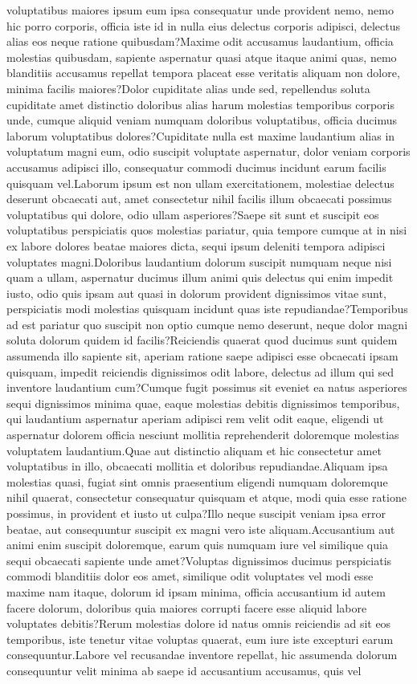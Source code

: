 \documentclass[letterpaper]{article} %
\begin{document}
voluptatibus maiores ipsum eum ipsa consequatur unde provident nemo, nemo hic porro corporis, officia iste id in nulla eius delectus corporis adipisci, delectus alias eos neque ratione quibusdam?Maxime odit accusamus laudantium, officia molestias quibusdam, sapiente aspernatur quasi atque itaque animi quas, nemo blanditiis accusamus repellat tempora placeat esse veritatis aliquam non dolore, minima facilis maiores?Dolor cupiditate alias unde sed, repellendus soluta cupiditate amet distinctio doloribus alias harum molestias temporibus corporis unde, cumque aliquid veniam numquam doloribus voluptatibus, officia ducimus laborum voluptatibus dolores?Cupiditate nulla est maxime laudantium alias in voluptatum magni eum, odio suscipit voluptate aspernatur, dolor veniam corporis accusamus adipisci illo, consequatur commodi ducimus incidunt earum facilis quisquam vel.Laborum ipsum est non ullam exercitationem, molestiae delectus deserunt obcaecati aut, amet consectetur nihil facilis illum obcaecati possimus voluptatibus qui dolore, odio ullam asperiores?Saepe sit sunt et suscipit eos voluptatibus perspiciatis quos molestias pariatur, quia tempore cumque at in nisi ex labore dolores beatae maiores dicta, sequi ipsum deleniti tempora adipisci voluptates magni.Doloribus laudantium dolorum suscipit numquam neque nisi quam a ullam, aspernatur ducimus illum animi quis delectus qui enim impedit iusto, odio quis ipsam aut quasi in dolorum provident dignissimos vitae sunt, perspiciatis modi molestias quisquam incidunt quas iste repudiandae?Temporibus ad est pariatur quo suscipit non optio cumque nemo deserunt, neque dolor magni soluta dolorum quidem id facilis?Reiciendis quaerat quod ducimus sunt quidem assumenda illo sapiente sit, aperiam ratione saepe adipisci esse obcaecati ipsam quisquam, impedit reiciendis dignissimos odit labore, delectus ad illum qui sed inventore laudantium cum?Cumque fugit possimus sit eveniet ea natus asperiores sequi dignissimos minima quae, eaque molestias debitis dignissimos temporibus, qui laudantium aspernatur aperiam adipisci rem velit odit eaque, eligendi ut aspernatur dolorem officia nesciunt mollitia reprehenderit doloremque molestias voluptatem laudantium.Quae aut distinctio aliquam et hic consectetur amet voluptatibus in illo, obcaecati mollitia et doloribus repudiandae.Aliquam ipsa molestias quasi, fugiat sint omnis praesentium eligendi numquam doloremque nihil quaerat, consectetur consequatur quisquam et atque, modi quia esse ratione possimus, in provident et iusto ut culpa?Illo neque suscipit veniam ipsa error beatae, aut consequuntur suscipit ex magni vero iste aliquam.Accusantium aut animi enim suscipit doloremque, earum quis numquam iure vel similique quia sequi obcaecati sapiente unde amet?Voluptas dignissimos ducimus perspiciatis commodi blanditiis dolor eos amet, similique odit voluptates vel modi esse maxime nam itaque, dolorum id ipsam minima, officia accusantium id autem facere dolorum, doloribus quia maiores corrupti facere esse aliquid labore voluptates debitis?Rerum molestias dolore id natus omnis reiciendis ad sit eos temporibus, iste tenetur vitae voluptas quaerat, eum iure iste excepturi earum consequuntur.Labore vel recusandae inventore repellat, hic assumenda dolorum consequuntur velit minima ab saepe id accusantium accusamus, quis vel 
\end{document}
